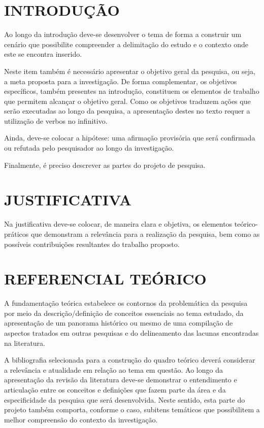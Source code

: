 \documentclass[12pt,a4paper]{article}
\begin{document}
\newpage
\thispagestyle{empty}
\tableofcontents

\newpage
\pagestyle{plain}
\renewcommand{\baselinestretch}{1.5}
\normalsize
\section{INTRODUÇÃO}
Ao longo da introdução deve-se desenvolver o tema de forma a construir um cenário que possibilite compreender a delimitação do estudo e o contexto onde este se encontra inserido.

Neste item também é necessário apresentar o objetivo geral da pesquisa, ou seja, a meta proposta para a investigação. De forma complementar, os objetivos específicos, também presentes na introdução, constituem os elementos de trabalho que permitem alcançar o objetivo geral. Como os objetivos traduzem ações que serão executadas ao longo da pesquisa, a apresentação destes no texto requer a utilização de verbos no infinitivo.

Ainda, deve-se colocar a hipótese: uma afirmação provisória que será confirmada ou refutada pelo pesquisador ao longo da investigação.

Finalmente, é preciso descrever as partes do projeto de pesquisa.

\section{JUSTIFICATIVA}
Na justificativa deve-se colocar, de maneira clara e objetiva, os elementos teórico-práticos que demonstram a relevância para a realização da pesquisa, bem como as possíveis contribuições resultantes do trabalho proposto.

\section{REFERENCIAL TEÓRICO}
A fundamentação teórica estabelece os contornos da problemática da pesquisa por meio da descrição/definição de conceitos essenciais ao tema estudado, da apresentação de um panorama histórico ou mesmo de uma compilação de aspectos tratados em outras pesquisas e do delineamento das lacunas encontradas na literatura.

A bibliografia selecionada para a construção do quadro teórico deverá considerar a relevância e atualidade em relação ao tema em questão. Ao longo da apresentação da revisão da literatura deve-se demonstrar o entendimento e articulação entre os conceitos e definições que fazem parte da área e da especificidade da pesquisa que será desenvolvida. Neste sentido, esta parte do projeto também comporta, conforme o caso, subitens temáticos que possibilitem a melhor compreensão do contexto da investigação.
\end{document}

